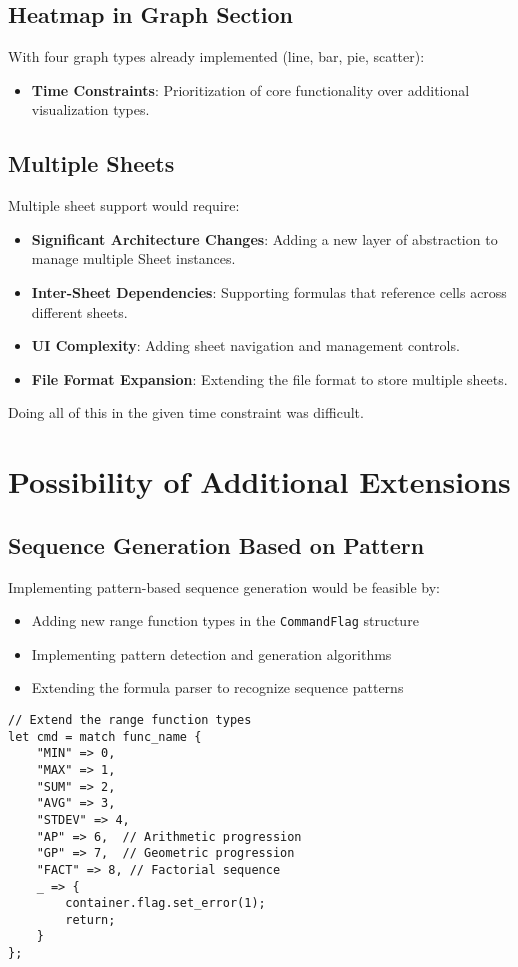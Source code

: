 \documentclass[12pt]{article}
\begin{document}
\subsection{Heatmap in Graph Section}
With four graph types already implemented (line, bar, pie, scatter):
\begin{itemize}
    \item \textbf{Time Constraints}: Prioritization of core functionality over additional visualization types.
\end{itemize}

\subsection{Multiple Sheets}
Multiple sheet support would require:
\begin{itemize}
    \item \textbf{Significant Architecture Changes}: Adding a new layer of abstraction to manage multiple Sheet instances.
    \item \textbf{Inter-Sheet Dependencies}: Supporting formulas that reference cells across different sheets.
    \item \textbf{UI Complexity}: Adding sheet navigation and management controls.
    \item \textbf{File Format Expansion}: Extending the file format to store multiple sheets.
\end{itemize}
Doing all of this in the given time constraint was difficult.

\section{Possibility of Additional Extensions}

\subsection{Sequence Generation Based on Pattern}
Implementing pattern-based sequence generation would be feasible by:
\begin{itemize}
    \item Adding new range function types in the \texttt{CommandFlag} structure
    \item Implementing pattern detection and generation algorithms
    \item Extending the formula parser to recognize sequence patterns
\end{itemize}

\begin{lstlisting}[caption={Potential implementation in parse.rs}]
// Extend the range function types
let cmd = match func_name {
    "MIN" => 0,
    "MAX" => 1,
    "SUM" => 2,
    "AVG" => 3,
    "STDEV" => 4,
    "AP" => 6,  // Arithmetic progression
    "GP" => 7,  // Geometric progression
    "FACT" => 8, // Factorial sequence
    _ => {
        container.flag.set_error(1);
        return;
    }
};
\end{lstlisting}
\end{document}
